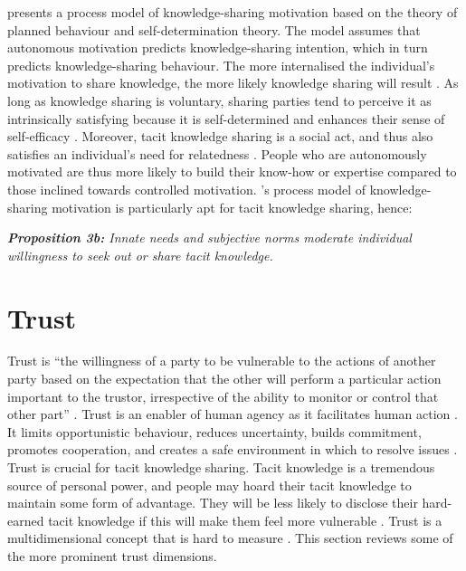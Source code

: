 \citet{gagne2009model} presents a process model of knowledge-sharing motivation based on the theory of planned behaviour and self-determination theory. The model assumes that autonomous motivation predicts knowledge-sharing intention, which in turn predicts knowledge-sharing behaviour. The more internalised the individual's motivation to share knowledge, the more likely knowledge sharing will result \citep{gagne2009model,witherspoon2013antecedents}. As long as knowledge sharing is voluntary, sharing parties tend to perceive it as intrinsically satisfying because it is self-determined and enhances their sense of self-efficacy \citep{lam2010knowledge,dumbach2014establishing}. Moreover, tacit knowledge sharing is a social act, and thus also satisfies an individual's need for relatedness \citep{llopis2016understanding}. People who are autonomously motivated are thus more likely to build their know-how or expertise compared to those inclined towards controlled motivation. \citeauthor{gagne2009model}'s \citeyearpar{gagne2009model} process model of knowledge-sharing motivation is particularly apt for tacit knowledge sharing, hence: \bigskip

\begin{tcolorbox}
\textit{\textbf{Proposition 3b:} Innate needs and subjective norms moderate individual willingness to seek out or share tacit knowledge.}
\end{tcolorbox}

\section{Trust}

Trust is \enquote{the willingness of a party to be vulnerable to the actions of another party based on the expectation that the other will perform a particular action important to the trustor, irrespective of the ability to monitor or control that other part} \citep[][pg. 712]{mayer1995integrative}. Trust is an enabler of human agency as it facilitates human action \citep{muller2008living,mcevily2011measuring}. It limits opportunistic behaviour, reduces uncertainty, builds commitment, promotes cooperation, and creates a safe environment in which to resolve issues \citep{nonaka1994dynamic,panteli2005trust,rasmussen2007work}. Trust is crucial for tacit knowledge sharing. Tacit knowledge is a tremendous source of personal power, and people may hoard their tacit knowledge to maintain some form of advantage. They will be less likely to disclose their hard-earned tacit knowledge if this will make them feel more vulnerable  \citep{levin2004strength,kankanhalli2005contributing,riege2005three,lin2007share,milne2007motivation,alsharo2017virtual}. Trust is a multidimensional concept that is hard to measure \citep{castelfranchi2008trust}. This section reviews some of the more prominent trust dimensions. 

